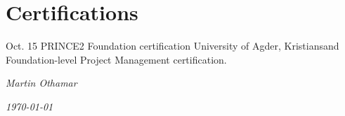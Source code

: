 \documentclass[]{cv-class}
\begin{document}
\section{Certifications}
\begin{entrylist}
  \entry
    {Oct. 15}
    {PRINCE2 Foundation certification}
    {University of Agder, Kristiansand}
    {Foundation-level Project Management certification.}
\end{entrylist}

\vspace{1.5cm}
\begin{flushright}
\emph{Martin Othamar}
\end{flushright}
\begin{flushright}
\emph{\today}
\end{flushright}
\end{document}
